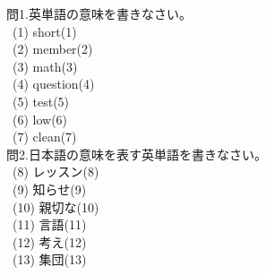 \documentclass[uplatex]{jsarticle}
\title{\vspace{-30mm}\flushleft{\huge{第2回\ (\ \ 月\ \ 日)\ Unit3〜4}}}
\author{\Large{\hspace{90mm}名前\hspace{40mm}得点\hspace{20mm}点}}
\date{\empty}
\begin{document}
\maketitle
\vspace{-10mm}
\Large 問1.英単語の意味を書きなさい。\\
\large\ (1) short\hspace{10mm}\hspace{\fill}(1)\underline{\hspace{35mm}}\\
\ (2) member\hspace{\fill}(2)\underline{\hspace{35mm}}\\
\ (3) math\hspace{\fill}(3)\underline{\hspace{35mm}}\\
\ (4) question\hspace{\fill}(4)\underline{\hspace{35mm}}\\
\ (5) test\hspace{\fill}(5)\underline{\hspace{35mm}}\\
\ (6) low\hspace{\fill}(6)\underline{\hspace{35mm}}\\
\ (7) clean\hspace{\fill}(7)\underline{\hspace{35mm}}\\
\Large 問2.日本語の意味を表す英単語を書きなさい。\\
\large\ (8) レッスン\hspace{\fill}(8)\underline{\hspace{35mm}}\\
\ (9) 知らせ\hspace{\fill}(9)\underline{\hspace{35mm}}\\
\ (10) 親切な\hspace{\fill}(10)\underline{\hspace{35mm}}\\
\ (11) 言語\hspace{\fill}(11)\underline{\hspace{35mm}}\\
\ (12) 考え\hspace{\fill}(12)\underline{\hspace{35mm}}\\
\ (13) 集団\hspace{\fill}(13)\underline{\hspace{35mm}}\\
\end{document}
